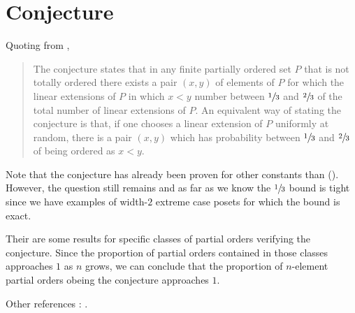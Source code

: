 \section{\onethirdtwothird Conjecture}

Quoting from \cite{wiki:linext},

\begin{quotation}
The \onethirdtwothird conjecture states that in
any finite partially ordered set $P$ that is not totally ordered there exists a
pair $(x,y)$ of elements of $P$ for which the linear extensions of $P$ in which
$x < y$ number between $\sfrac{1}{3}$ and $\sfrac{2}{3}$ of the total number of
linear extensions of $P$. An equivalent way of stating the conjecture is that,
if one chooses a linear extension of $P$ uniformly at random, there is a pair
$(x,y)$ which has probability between $\sfrac{1}{3}$ and $\sfrac{2}{3}$ of
being ordered as $x < y$.
\end{quotation}

Note that the conjecture has already been proven for other constants than
\onethirdtwothird (\citet*{kahn1984balancing, linial1984information,
kahn1991balancing, brightwell1995balancing, brightwell1999balanced}).
However, the question still remains and as far as we
know the $\sfrac{1}{3}$ bound is tight since we have examples of width-$2$
extreme case posets for which the bound is exact.


Their are some results for specific classes of partial orders verifying the
conjecture. Since the proportion of partial orders contained in those classes
approaches $1$ as $n$ grows, we can conclude that the proportion of $n$-element
partial orders obeing the \onethirdtwothird conjecture approaches $1$.


Other references : \citet*{zaguia20111,peczarski2006gold,peczarski2008gold}.
